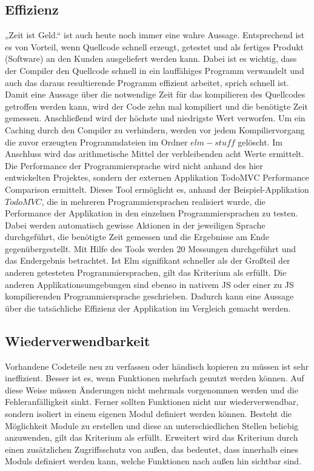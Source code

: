 \subsection{Effizienz}
\label{sec:muster_effizienz}
„Zeit ist Geld.“ ist auch heute noch immer eine wahre Aussage. Entsprechend ist es von Vorteil, wenn Quellcode schnell erzeugt, getestet und als fertiges Produkt (Software) an den Kunden ausgeliefert werden kann. Dabei ist es wichtig, dass der Compiler den Quellcode schnell in ein lauffähiges Programm verwandelt und auch das daraus resultierende Programm effizient arbeitet, sprich schnell ist. Damit eine Aussage über die notwendige Zeit für das kompilieren des Quellcodes getroffen werden kann, wird der Code zehn mal kompiliert und die benötigte Zeit gemessen. Anschließend wird der höchste und niedrigste Wert verworfen. Um ein Caching durch den Compiler zu verhindern, werden vor jedem Kompiliervorgang die zuvor erzeugten Programmdateien im Ordner $elm-stuff$ gelöscht. Im Anschluss wird das arithmetische Mittel der verbleibenden acht Werte ermittelt.
Die Performance der Programmiersprache wird nicht anhand des hier entwickelten Projektes, sondern der externen Applikation \cite{https://github.com/evancz/todomvc-perf-comparison/} TodoMVC Performance Comparison ermittelt. Dieses Tool ermöglicht es, anhand der Beispiel-Applikation $TodoMVC$, die in mehreren Programmiersprachen realisiert wurde, die Performance der Applikation in den einzelnen Programmiersprachen zu testen. Dabei werden automatisch gewisse Aktionen in der jeweiligen Sprache durchgeführt, die benötigte Zeit gemessen und die Ergebnisse am Ende gegenübergestellt. Mit Hilfe des Tools werden 20 Messungen durchgeführt und das Endergebnis betrachtet. Ist Elm signifikant schneller als der Großteil der anderen getesteten Programmiersprachen, gilt das Kriterium als erfüllt. Die anderen Applikationsumgebungen sind ebenso in nativem \ac{JS} oder einer zu \ac{JS} kompilierenden Programmiersprache geschrieben. Dadurch kann eine Aussage über die tatsächliche Effizienz der Applikation im Vergleich gemacht werden.


\subsection{Wiederverwendbarkeit}
\label{sec:muster_wiederverwendbarkeit}
Vorhandene Codeteile neu zu verfassen oder händisch kopieren zu müssen ist sehr ineffizient. Besser ist es, wenn Funktionen mehrfach genutzt werden können. Auf diese Weise müssen Änderungen nicht mehrmals vorgenommen werden und die Fehleranfälligkeit sinkt. Ferner sollten Funktionen nicht nur wiederverwendbar, sondern isoliert in einem eigenen Modul definiert werden können. Besteht die Möglichkeit Module zu erstellen und diese an unterschiedlichen Stellen beliebig anzuwenden, gilt das Kriterium als erfüllt. Erweitert wird das Kriterium durch einen zusätzlichen Zugriffsschutz von außen, das bedeutet, dass innerhalb eines Moduls definiert werden kann, welche Funktionen nach außen hin sichtbar sind.


